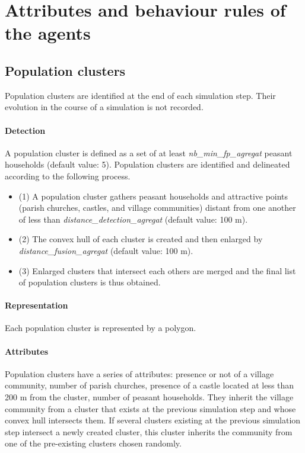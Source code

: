 \documentclass[a4paper,11pt]{article}
\begin{document}
\section{Attributes and behaviour rules of the agents}

\subsection{Population clusters}

Population clusters are identified at the end of each simulation step. Their evolution in the course of a simulation is not recorded.

\begin{sloppypar}
\paragraph{Detection}
A population cluster is defined as a set of at least \textit{nb\_min\_fp\_agregat} peasant households (default value: 5). Population clusters are identified and delineated according to the following process.
\begin{itemize}
  \item (1) A population cluster gathers peasant households and attractive points (parish churches, castles, and village communities) distant from one another of less than \textit{distance\_detection\_agregat} (default value: 100 m).
  \item (2) The convex hull of each cluster is created and then enlarged by \textit{distance\_fusion\_agregat} (default value: 100 m).
  \item (3) Enlarged clusters that intersect each others are merged and the final list of population clusters is thus obtained.
\end{itemize}
\end{sloppypar}

\paragraph{Representation}
Each population cluster is represented by a polygon.

\paragraph{Attributes}
Population clusters have a series of attributes: presence or not of a village community, number of parish churches, presence of a castle located at less than 200 m from the cluster, number of peasant households. They inherit the village community from a cluster that exists at the previous simulation step and whose convex hull intersects them. If several clusters existing at the previous simulation step intersect a newly created cluster, this cluster inherits the community from one of the pre-existing clusters chosen randomly.
\end{document}
